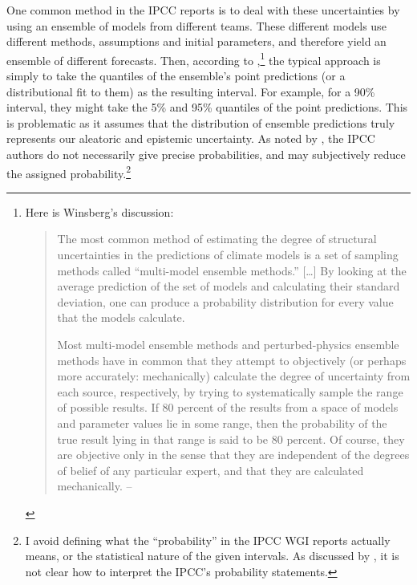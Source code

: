 \documentclass[letterpaper,12pt]{article}
\begin{document}
One common method in the IPCC reports is to deal with these uncertainties by using an ensemble of models from different teams. These different models use different methods, assumptions and initial parameters, and therefore yield an ensemble of different forecasts. Then, according to \citet[pg. 96]{winsberg2018philosophy},\footnote{Here is Winsberg's discussion: \begin{quote}
  The most common method of estimating the degree of structural uncertainties in the predictions of climate models is a set of sampling methods called ``multi-model ensemble methods.'' [\ldots] By looking at the average prediction of the set of models and calculating their standard deviation, one can produce a probability distribution for every value that the models calculate.
  
  Most multi-model ensemble methods and perturbed-physics ensemble methods have in common that they attempt to objectively (or perhaps more accurately: mechanically) calculate the degree of uncertainty from each source, respectively, by trying to systematically sample the range of possible results. If 80 percent of the results from a space of models and parameter values lie in some range, then the probability of the true result lying in that range is said to be 80 percent. Of course, they are objective only in the sense that they are independent of the degrees of belief of any particular expert, and that they are calculated mechanically.
  \hfill -- \citet[pg. 96]{winsberg2018philosophy}
\end{quote}} the typical approach is simply to take the quantiles of the ensemble's point predictions (or a distributional fit to them) as the resulting interval. For example, for a 90\% interval, they might take the 5\% and 95\% quantiles of the point predictions. This is problematic as it assumes that the distribution of ensemble predictions truly represents our aleatoric and epistemic uncertainty. As noted by \citet[Section 2.5.2, pg. 63]{harris2021conceptualizing}, the IPCC authors do not necessarily give precise probabilities, and may subjectively reduce the assigned probability.\footnote{I avoid defining what the ``probability'' in the IPCC WGI reports actually means, or the statistical nature of the given intervals. As discussed by \citet[Section 1.4]{harris2021conceptualizing}, it is not clear how to interpret the IPCC's probability statements.}

\end{document}
